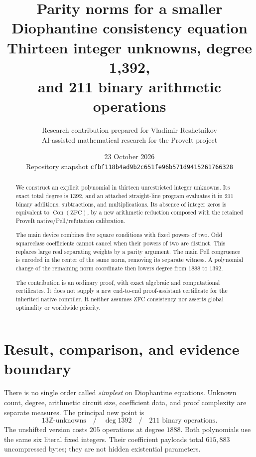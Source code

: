 \documentclass[11pt]{article}
\title{\color{ink}\bfseries Parity norms for a smaller\\Diophantine consistency equation\\[7pt]
\large Thirteen integer unknowns, degree 1,392,\\and 211 binary arithmetic operations}
\author{Research contribution prepared for Vladimir Reshetnikov\\
\small AI-assisted mathematical research for the ProveIt project}
\date{23 October 2026\\
\small Repository snapshot \texttt{cfbf118b4ad9b2c651fe96b571d9415261766328}}
\newcommand{\Z}{\mathbb Z}
\newcommand{\Con}{\operatorname{Con}}
\theoremstyle{remark}
\begin{document}
\maketitle
\begin{abstract}
We construct an explicit polynomial in thirteen unrestricted integer
unknowns. Its exact total degree is \(1392\), and an attached straight-line
program evaluates it in \(211\) binary additions, subtractions, and
multiplications. Its absence of integer zeros is equivalent to
\(\Con(\mathrm{ZFC})\), by a new arithmetic reduction composed with the
retained ProveIt native/Pell/refutation calibration.

The main device combines five square conditions with fixed powers of two.
Odd squareclass coefficients cannot cancel when their powers of two are
distinct. This replaces large real separating weights by a parity argument.
The main Pell congruence is encoded in the center of the same norm, removing
its separate witness. A polynomial change of the remaining norm coordinate
then lowers degree from \(1888\) to \(1392\).

The contribution is an ordinary proof, with exact algebraic and computational
certificates. It does not supply a new end-to-end proof-assistant certificate
for the inherited native compiler. It neither assumes ZFC consistency nor
asserts global optimality or worldwide priority.
\end{abstract}

\section{Result, comparison, and evidence boundary}

There is no single order called \emph{simplest} on Diophantine equations.
Unknown count, degree, arithmetic circuit size, coefficient data, and proof
complexity are separate measures. The principal new point is
\[
  \boxed{13\Z\text{-unknowns}\quad/\quad \deg 1392\quad/\quad
          211\text{ binary operations}.}
\]
The unshifted version costs \(205\) operations at degree \(1888\). Both
polynomials use the same six literal fixed integers. Their coefficient
payloads total \(615{,}883\) uncompressed bytes; they are not hidden
existential parameters.
\end{document}

